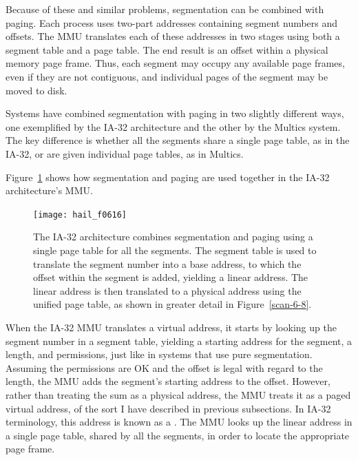 Because of these and similar problems, segmentation can be combined
with paging.  Each process uses two-part addresses containing segment
numbers and offsets.  The MMU translates each of these addresses in
two stages using both a segment table and a page table.  The end
result is an offset within a physical memory page frame. Thus, each
segment may occupy any available page frames, even if they are not
contiguous, and individual pages of the segment may be moved to disk.

Systems have combined segmentation with paging in two slightly
different ways, one exemplified by the IA-32 architecture and the
other by the Multics system.  The key difference is whether all the
segments share a single page table, as in the IA-32, or are given
individual page tables, as in Multics.

Figure~\ref{scan-6-9} shows how segmentation and paging are used
together in the IA-32 architecture's MMU.
\begin{figure}
\centerline{\texttt{[image: hail\_f0616]}}
\caption{The IA-32 architecture combines segmentation and paging
  using a single page table for all the segments.  The segment table
  is used to translate the segment number into a base address, to
  which the offset within the segment is added, yielding a linear
  address.  The linear address is then translated to a physical
  address using the unified page table, as shown in greater detail in Figure~\ref{scan-6-8}.}
\label{scan-6-9}
\end{figure}
When the IA-32 MMU translates a virtual address, it starts by looking up
the segment number in a segment table, yielding a starting address
for the segment, a length, and permissions, just like in systems that
use pure segmentation.  Assuming the permissions are OK and the offset
is legal with regard to the length, the MMU adds the segment's
starting address to the offset.  However, rather than treating the sum
as a physical address, the MMU treats it as a paged virtual address,
of the sort I have described in previous subsections.  In IA-32
terminology, this address is known as a .  The
MMU looks up the linear address in a single page table, shared by all
the segments, in order to locate the appropriate page frame.

